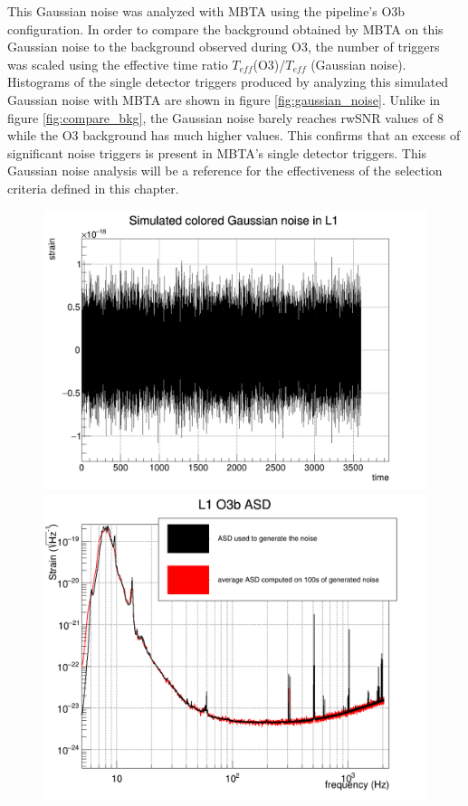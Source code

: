 This Gaussian noise was analyzed with MBTA using the pipeline's O3b configuration.
In order to compare the background obtained by MBTA on this Gaussian noise to the background observed during O3, the number of triggers was scaled using the effective time ratio $T_{eff}$(O3)/$T_{eff}$ (Gaussian noise).
Histograms of the single detector triggers produced by analyzing this simulated Gaussian noise with MBTA are shown in figure \ref{fig:gaussian_noise}.
Unlike in figure \ref{fig:compare_bkg}, the Gaussian noise barely reaches rwSNR values of 8 while the O3 background has much higher values.
This confirms that an excess of significant noise triggers is present in MBTA's single detector triggers.
This Gaussian noise analysis will be a reference for the effectiveness of the selection criteria defined in this chapter.

\begin{figure}[hb]
  \centering
  \begin{minipage}{0.45\linewidth}
    \centering
    \includegraphics[width=\linewidth]{sectionSelection/plotsOther/cNoise.png}
  \end{minipage}
  \hfill
  \begin{minipage}{0.45\linewidth}
    \centering
    \includegraphics[width=\linewidth]{sectionSelection/plotsOther/cASDL1.png}

\end{minipage}
\end{figure}
